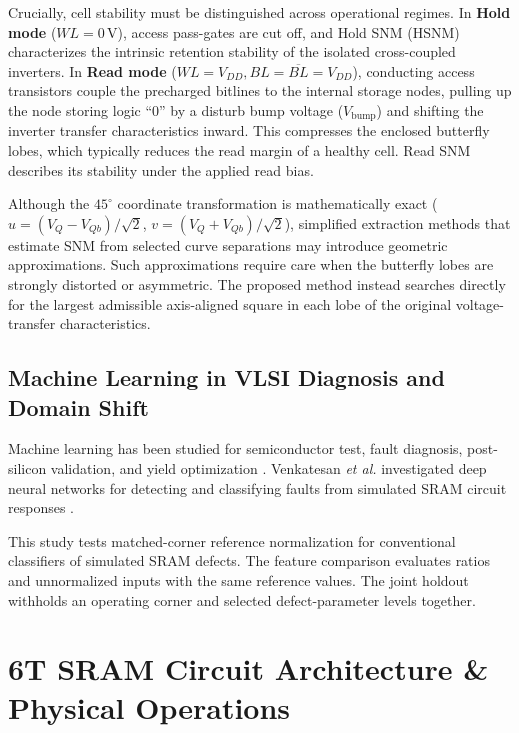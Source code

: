 \documentclass[conference]{IEEEtran}
\begin{document}
Crucially, cell stability must be distinguished across operational regimes. In \textbf{Hold mode} ($WL=0\,\text{V}$), access pass-gates are cut off, and Hold SNM (HSNM) characterizes the intrinsic retention stability of the isolated cross-coupled inverters. In \textbf{Read mode} ($WL=V_{DD}, BL=\overline{BL}=V_{DD}$), conducting access transistors couple the precharged bitlines to the internal storage nodes, pulling up the node storing logic ``0'' by a disturb bump voltage ($V_{\text{bump}}$) and shifting the inverter transfer characteristics inward. This compresses the enclosed butterfly lobes, which typically reduces the read margin of a healthy cell. Read SNM describes its stability under the applied read bias.

Although the $45^\circ$ coordinate transformation is mathematically exact ($u = (V_Q - V_{Qb})/\sqrt{2}$, $v = (V_Q + V_{Qb})/\sqrt{2}$), simplified extraction methods that estimate SNM from selected curve separations may introduce geometric approximations. Such approximations require care when the butterfly lobes are strongly distorted or asymmetric. The proposed method instead searches directly for the largest admissible axis-aligned square in each lobe of the original voltage-transfer characteristics.

\subsection{Machine Learning in VLSI Diagnosis and Domain Shift}
Machine learning has been studied for semiconductor test, fault diagnosis, post-silicon validation, and yield optimization \cite{makris2018special, amrouch2022machine}. Venkatesan \emph{et al.} investigated deep neural networks for detecting and classifying faults from simulated SRAM circuit responses \cite{venkatesan2024sram}.

This study tests matched-corner reference normalization for conventional classifiers of simulated SRAM defects. The feature comparison evaluates ratios and unnormalized inputs with the same reference values. The joint holdout withholds an operating corner and selected defect-parameter levels together.


\section{6T SRAM Circuit Architecture \& Physical Operations}
\label{sec:circuit}
\end{document}
